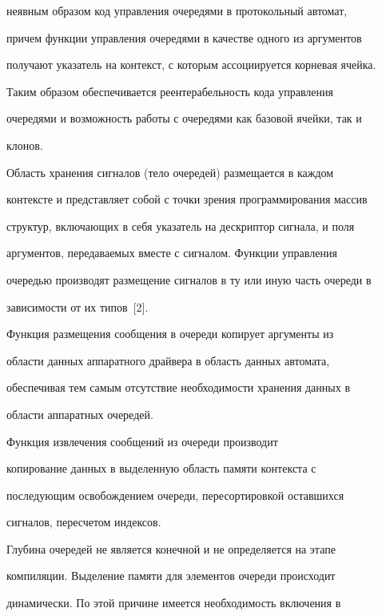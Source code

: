неявным образом код управления очередями в протокольный автомат, 


причем функции управления очередями в качестве одного из аргументов 


получают указатель на контекст, с которым ассоциируется корневая ячейка. 


Таким образом обеспечивается реентерабельность кода управления 


очередями и возможность работы с очередями как базовой ячейки, так и 


клонов.


      


      Область хранения сигналов (тело очередей) размещается в каждом 


контексте и представляет собой с точки зрения программирования массив 


структур, включающих в себя указатель на дескриптор сигнала, и поля 


аргументов, передаваемых вместе с сигналом. Функции управления 


очередью производят размещение сигналов в ту или иную часть очереди в 


зависимости от их типов~[2].


      


      Функция размещения сообщения в очереди копирует аргументы из 


области данных аппаратного драйвера в область данных автомата, 


обеспечивая тем самым отсутствие необходимости хранения данных в 


области аппаратных очередей.


      


      Функция извлечения сообщений из очереди производит 


копирование данных в выделенную область памяти контекста с 


последующим освобождением очереди, пересортировкой оставшихся 


сигналов, пересчетом индексов. 


      


      Глубина очередей не является конечной и не определяется на этапе 


компиляции. Выделение памяти для элементов очереди происходит 


динамически. По этой причине имеется необходимость включения в 


